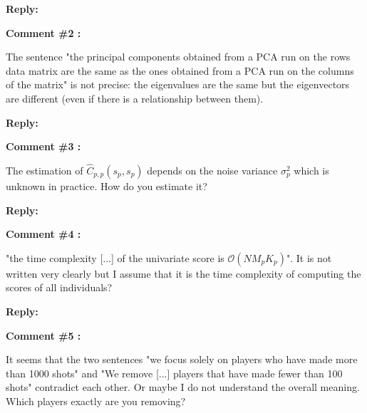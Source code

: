 \documentclass[11pt]{article}
\begin{document}
\medskip

\normalfont

\textbf{Reply:} 

\bigskip

\itshape

\textbf{Comment \#2 :}

The sentence "the principal components obtained from a PCA run on
the rows data matrix are the same as the ones obtained from a PCA run on the
columns of the matrix" is not precise: the eigenvalues are the same but the eigenvectors are diﬀerent (even if there is a relationship between them).

\medskip

\normalfont

\textbf{Reply:}



\bigskip

\itshape


\textbf{Comment \#3 :}

The estimation of $\widehat{C}_{p,p}(s_p,s_p)$ depends on the noise variance $\sigma^2_p$ which is unknown in practice. How do you estimate it?

\medskip

\normalfont

\textbf{Reply:}



\bigskip


\itshape


\textbf{Comment \#4 :}

 "the time complexity [...] of the univariate score is $\mathcal{O}(NM_pK_p)$". It is not written very clearly but I assume that it is the time complexity of computing the scores of all individuals?


\medskip

\normalfont

\textbf{Reply:}

\bigskip


\itshape



\textbf{Comment \#5 :}

It seems that the two sentences "we focus solely on players who have made more than 1000 shots" and "We remove [...] players that have made fewer than 100 shots" contradict each other. Or maybe I do not understand the overall meaning. Which players exactly are you removing?


\medskip

\normalfont
\end{document}
